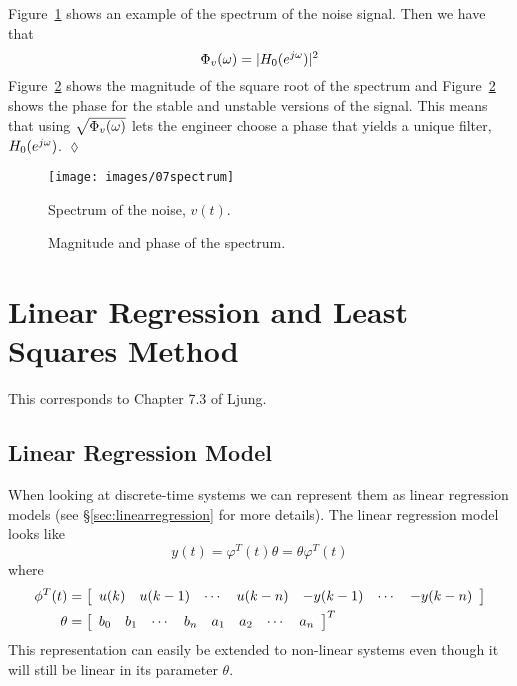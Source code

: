 \begin{example}
Figure~\ref{fig:07spectrum} shows an example of the spectrum of the noise signal.
Then we have that
$$\Phi_v(\omega) = |H_0(e^{j\omega})|^2$$
Figure~\ref{fig:07magphase} shows the magnitude of the square root of the spectrum and Figure~\ref{fig:07magphase} shows the phase for the stable and unstable versions of the signal.
This means that using $\sqrt{\Phi_v(\omega)}$ lets the engineer choose a phase that yields a unique filter, $H_0(e^{j\omega})$.
$\lozenge$
\end{example}

\begin{figure}[ht!]
\centering
\texttt{[image: images/07spectrum]}
\caption{Spectrum of the noise, $v(t)$.}
\label{fig:07spectrum}
\end{figure}

\begin{figure}[ht!]
\centering
{} \hfill
{} \hfill
\caption{Magnitude and phase of the spectrum.}
\label{fig:07magphase}
\end{figure}

\section{Linear Regression and Least Squares Method}
This corresponds to Chapter 7.3 of Ljung.

\subsection{Linear Regression Model}
When looking at discrete-time systems we can represent them as linear regression models (see \S\ref{sec:linearregression} for more details).
The linear regression model looks like
$$y(t) = \varphi^T(t)\theta = \theta\varphi^T(t)$$
where
\begin{align*}
\phi^T(t) &= \left[\begin{array}{c c c c c c c}
u(k) & u(k-1) & \cdots & u(k-n) & -y(k-1) & \cdots & -y(k-n) \end{array}\right] \\
\theta{} &= \left[\begin{array}{c c c c c c c c}
b_0 & b_1 & \cdots & b_n & a_1 & a_2 & \cdots & a_n \end{array}\right]^T
\end{align*}
This representation can easily be extended to non-linear systems even though it will still be linear in its parameter $\theta$.

